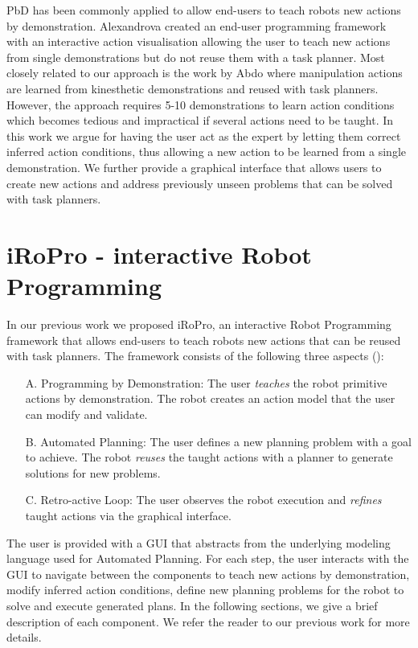 PbD has been commonly applied to allow end-users to teach robots new actions by demonstration.
Alexandrova \etal \cite{alexandrova2014robot} created an end-user programming framework with an interactive action visualisation allowing the user to teach new actions from single demonstrations but do not reuse them with a task planner.
Most closely related to our approach is the work by Abdo \etal \cite{abdo2013learning} where manipulation actions are learned from kinesthetic demonstrations and reused with task planners.
However, the approach requires 5-10 demonstrations to learn action conditions which becomes tedious and impractical if several actions need to be taught.
In this work we argue for having the user act as the expert by letting them correct inferred action conditions, thus allowing a new action to be learned from a single demonstration.
We further provide a graphical interface that allows users to create new actions and address previously unseen problems that can be solved with task planners.


\section{iRoPro - interactive Robot Programming} \label{sec:approach} 
In our previous work \cite{liang2017a} we proposed iRoPro, an interactive Robot Programming framework that allows end-users to teach robots new actions that can be reused with task planners.
The framework consists of the following three aspects (): 
\begin{enumerate}
	\item[A.]{Programming by Demonstration: The user \textit{teaches} the robot primitive actions by demonstration. The robot creates an action model that the user can modify and validate.}
	\item[B.]{Automated Planning: The user defines a new planning problem with a goal to achieve. The robot \textit{reuses} the taught actions with a planner to generate solutions for new problems.}
	\item[C.]{Retro-active Loop: The user observes the robot execution and \textit{refines} taught actions via the graphical interface.}
\end{enumerate}
The user is provided with a GUI that abstracts from the underlying modeling language used for Automated Planning.
For each step, the user interacts with the GUI to navigate between the components to teach new actions by demonstration, modify inferred action conditions, define new planning problems for the robot to solve and execute generated plans.
In the following sections, we give a brief description of each component.
We refer the reader to our previous work \cite{liang2017a,liang2017b} for more details. 

